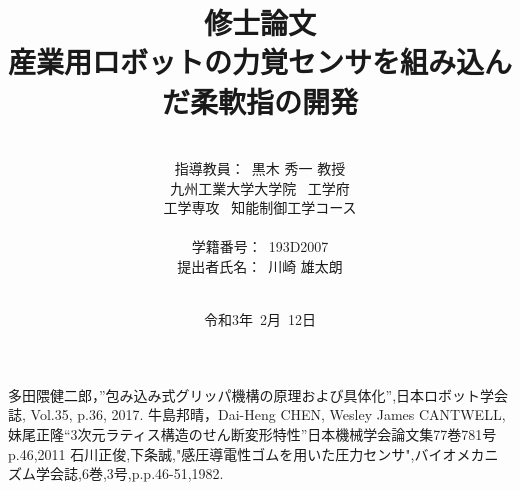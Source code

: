 \documentclass[a4paper,12pt]{jarticle}
\title{修士論文\\
産業用ロボットの力覚センサを組み込んだ柔軟指の開発\\
}
\author{\vspace{90mm}\\
指導教員：\ 黒木 \hspace{0mm} 秀一 教授\\
九州工業大学大学院\ \hspace{0mm} 工学府\\
工学専攻\ \hspace{0mm} 知能制御工学コース \\
\vspace{0mm}\\
学籍番号：\ 193D2007\\
提出者氏名：\ 川崎 \hspace{0mm} 雄太朗\\\vspace{5mm}\\ }
\date{令和3年\ 2月\ 12日}
\begin{document}
\titlepage
\maketitle
\thispagestyle{empty}
\newpage

\thispagestyle{empty}

\newpage
\tableofcontents


\newpage

\newpage
%
\newpage

\newpage

\newpage
%
\newpage
%




\begin{thebibliography}{99}

 多田隈健二郎，”包み込み式グリッパ機構の原理および具体化”,日本ロボット学会誌, Vol.35, p.36, 2017.
牛島邦晴，Dai-Heng CHEN, Wesley James CANTWELL, 妹尾正隆“3次元ラティス構造のせん断変形特性”日本機械学会論文集77巻781号p.46,2011
 石川正俊,下条誠,"感圧導電性ゴムを用いた圧力センサ",バイオメカニズム学会誌,6巻,3号,p.p.46-51,1982.










\end{thebibliography}
\end{document}
